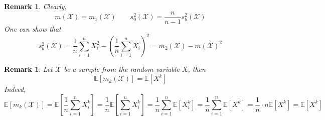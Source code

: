 \documentclass[12pt]{article}
\newtheorem{remark}[theorem]{Remark}
\begin{document}
\begin{remark} Clearly,
$$
m(\mathscr{X})=m_{1}(\mathscr{X})
\quad\quad
s_{0}^2(\mathscr{X})=\frac{n}{n-1}s_b^2(\mathscr{X})
$$
One can show that
$$
s_b^2(\mathscr{X})=\frac{1}{n}\sum_{i=1}^n X_i^2-\left(\frac{1}{n}\sum_{i=1}^n X_i\right)^2=m_2(\mathscr{X})-m(\mathscr{X})^2
$$
\end{remark}

\begin{remark} Let $\mathscr{X}$ be a sample from the random variable $X$, then
$$
\mathbb{E}[m_{k}(\mathscr{X})]=\mathbb{E}[X^k]
$$
Indeed,
$$
\mathbb{E}[m_{k}(\mathscr{X})]
=\mathbb{E}\left[\frac{1}{n}\sum_{i=1}^n X_i^k\right]
=\frac{1}{n}\mathbb{E}\left[\sum_{i=1}^n X_i^k\right]
=\frac{1}{n}\sum_{i=1}^n \mathbb{E}[X_i^k]
=\frac{1}{n}\sum_{i=1}^n \mathbb{E}[X^k]
=\frac{1}{n}\cdot n\mathbb{E}[X^k]
=\mathbb{E}[X^k]
$$
\end{remark}
\end{document}
